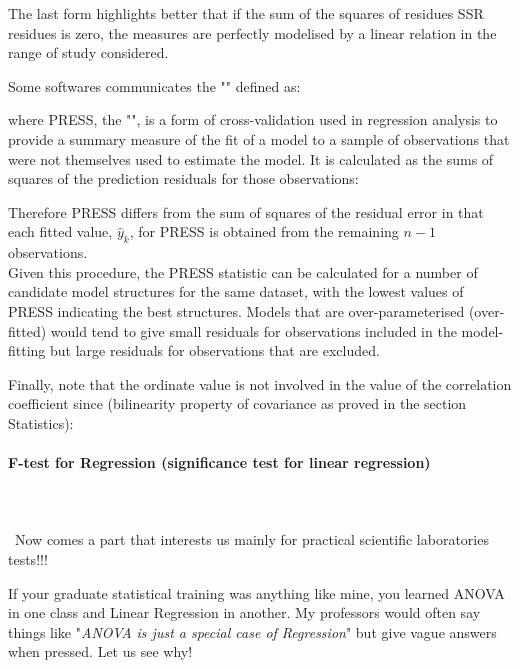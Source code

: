	The last form highlights better that if the sum of the squares of residues SSR  residues is zero, the measures are perfectly modelised by a linear relation in the range of study considered.
	
	\begin{tcolorbox}[title=Remark,colframe=black,arc=10pt]
	Some softwares communicates the "" defined as:
	
	 where PRESS, the "", is a form of cross-validation used in regression analysis to provide a summary measure of the fit of a model to a sample of observations that were not themselves used to estimate the model. It is calculated as the sums of squares of the prediction residuals for those observations:
	 
	Therefore PRESS differs from the sum of squares of the residual error in that each fitted value, $\hat{y}_k$, for PRESS is obtained from the remaining $n-1$ observations.\\
	
	Given this procedure, the PRESS statistic can be calculated for a number of candidate model structures for the same dataset, with the lowest values of PRESS indicating the best structures. Models that are over-parameterised (over-fitted) would tend to give small residuals for observations included in the model-fitting but large residuals for observations that are excluded.
	\end{tcolorbox}
	
	Finally, note that the ordinate value is not involved in the value of the correlation coefficient since (bilinearity property of covariance as proved in the section Statistics):
	
	
	\pagebreak
	\paragraph{F-test for Regression (significance test for linear regression)}\label{dummy variable regression}\label{anova for linear regression}\mbox{}\\\\\
	Now comes a part that interests us mainly for practical scientific laboratories tests!!! 
	
	If your graduate statistical training was anything like mine, you learned ANOVA in one class and Linear Regression in another. My professors would often say things like "\textit{ANOVA is just a special case of Regression}" but give vague answers when pressed. Let us see why!
	
